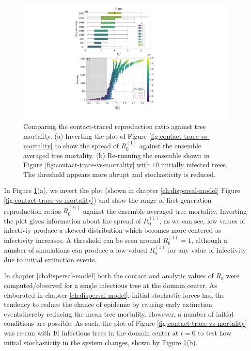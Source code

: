 \begin{figure}
    \centering
    \includegraphics[scale=0.60]{chapter5/figures/fig6-R0-contact-vs-mortality-A.pdf}
    \caption{Comparing the contact-traced reproduction ratio against tree mortality. (a) Inverting the plot of Figure \ref{fig:contact-trace-vs-mortality} to show the spread of $R_0^{(1)}$ against the ensemble averaged tree mortality. (b)
    Re-running the ensemble shown in Figure \ref{fig:contact-trace-vs-mortality} with $10$ initially infected trees. The threshold appears more abrupt and stochasticity is reduced.}
    \label{fig:R0-contact-vs-morality-A}
\end{figure}

In Figure \ref{fig:R0-contact-vs-morality-A}(a), we invert the plot (shown in chapter \ref{ch:dispersal-model} Figure \ref{fig:contact-trace-vs-mortality}) and show the range of first generation reproduction ratios $R_0^{(i1)}$ against the ensemble-averaged tree mortality.
Inverting the plot gives information about the spread of $R_0^{(1)}$;
as we can see, low values of infectiviy produce a skewed distribution which becomes more centered as infectivity increases.
A threshold can be seen around $R_0^{(1)}=1$, although a number of simulations can produce a low-valued $R_0^{(1)}$ for any value of infectivity due to initial extinction events.

In chapter \ref{ch:dispersal-model} both the contact and analytic values of $R_0$ were computed/observed for a single infectious tree at the domain center.
As elaborated in chapter \ref{ch:dispersal-model}, initial stochastic forces had the tendency to reduce the chance of epidemic by causing early extinction events\textemdash thereby reducing the mean tree mortality.
However, a number of initial conditions are possible.
As such, the plot of Figure \ref{fig:contact-trace-vs-mortality} was re-run with $10$ infectious trees in the domain center at $t=0$ to test how initial stochasticity in the system changes, shown by Figure \ref{fig:R0-contact-vs-morality-A}(b).

